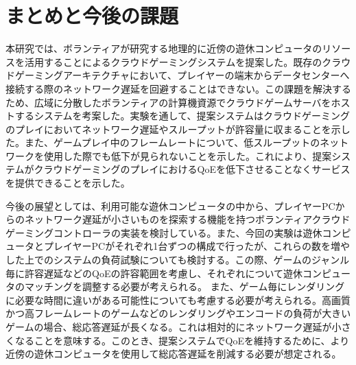 \section{まとめと今後の課題}
本研究では、ボランティアが研究する地理的に近傍の遊休コンピュータのリソースを活用することによるクラウドゲーミングシステムを提案した。既存のクラウドゲーミングアーキテクチャにおいて、プレイヤーの端末からデータセンターへ接続する際のネットワーク遅延を回避することはできない。この課題を解決するため、広域に分散したボランティアの計算機資源でクラウドゲームサーバをホストするシステムを考案した。実験を通して、提案システムはクラウドゲーミングのプレイにおいてネットワーク遅延やスループットが許容量に収まることを示した。また、ゲームプレイ中のフレームレートについて、低スループットのネットワークを使用した際でも低下が見られないことを示した。これにより、提案システムがクラウドゲーミングのプレイにおけるQoEを低下させることなくサービスを提供できることを示した。

今後の展望としては、利用可能な遊休コンピュータの中から、プレイヤーPCからのネットワーク遅延が小さいものを探索する機能を持つボランティアクラウドゲーミングコントローラの実装を検討している。また、今回の実験は遊休コンピュータとプレイヤーPCがそれぞれ1台ずつの構成で行ったが、これらの数を増やした上でのシステムの負荷試験についても検討する。この際、ゲームのジャンル毎に許容遅延などのQoEの許容範囲を考慮し、それぞれについて遊休コンピュータのマッチングを調整する必要が考えられる。
また、ゲーム毎にレンダリングに必要な時間に違いがある可能性についても考慮する必要が考えられる。高画質かつ高フレームレートのゲームなどのレンダリングやエンコードの負荷が大きいゲームの場合、総応答遅延が長くなる。これは相対的にネットワーク遅延が小さくなることを意味する。このとき、提案システムでQoEを維持するために、より近傍の遊休コンピュータを使用して総応答遅延を削減する必要が想定される。

